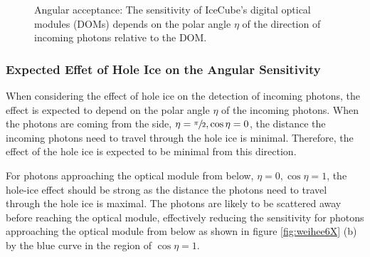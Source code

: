 \begin{figure}[htbp]
  \hfill
  \caption{Angular acceptance: The sensitivity of IceCube's digital optical modules (DOMs) depends on the polar angle $\eta$ of the direction of incoming photons relative to the DOM.}
  \label{fig:weihee6X}\label{fig:icepaper}
\end{figure}


\subsubsection{Expected Effet of Hole Ice on the Angular Sensitivity}
\label{sec:hole_ice_effects}

When considering the effect of hole ice on the detection of incoming photons, the effect is expected to depend on the polar angle $\eta$ of the incoming photons. \cite{icepaper} When the photons are coming from the side, $\eta = \sfrac{\pi}{2}, \cos \eta = 0$, the distance the incoming photons need to travel through the hole ice is minimal. Therefore, the effect of the hole ice is expected to be minimal from this direction.

For photons approaching the optical module from below, $\eta = 0, \cos \eta = 1$, the hole-ice effect should be strong as the distance the photons need to travel through the hole ice is maximal. The photons are likely to be scattered away before reaching the optical module, effectively reducing the sensitivity for photons approaching the optical module from below as shown in figure \ref{fig:weihee6X} (b) by the blue curve in the region of $\cos \eta = 1$.

